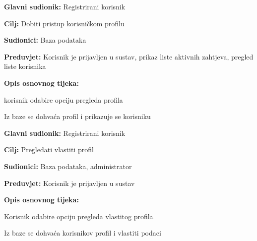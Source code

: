 \noindent {}
\begin{packed_item}
	
	\item \textbf{Glavni sudionik: } Registrirani korisnik
	\item  \textbf{Cilj:} Dobiti pristup korisničkom profilu
	\item  \textbf{Sudionici:} Baza podataka
	\item  \textbf{Preduvjet:} Korisnik je prijavljen u sustav, prikaz liste aktivnih zahtjeva, pregled liste korisnika
	\item  \textbf{Opis osnovnog tijeka:}
	
	\item[] \begin{packed_enum}
		
		\item korisnik odabire opciju pregleda profila
		\item Iz baze se dohvaća profil i prikazuje se korisniku
	\end{packed_enum}
\end{packed_item}
\noindent {}
\begin{packed_item}
	
	\item \textbf{Glavni sudionik: } Registrirani korisnik
	\item  \textbf{Cilj:} Pregledati vlastiti profil
	\item  \textbf{Sudionici:} Baza podataka, administrator
	\item  \textbf{Preduvjet:} Korisnik je prijavljen u sustav
	\item  \textbf{Opis osnovnog tijeka:}
	
	\item[] \begin{packed_enum}
		
		\item Korisnik odabire opciju pregleda vlastitog profila
		\item Iz baze se dohvaća korisnikov profil i vlastiti podaci
	\end{packed_enum}
\end{packed_item}
\noindent {}
